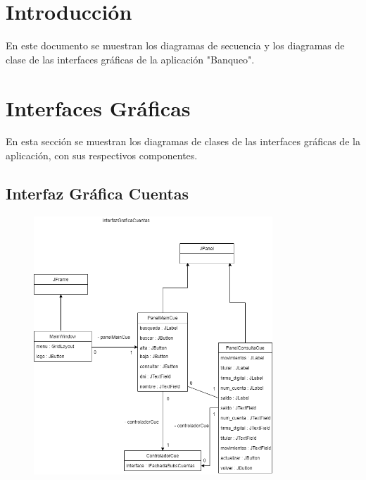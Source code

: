 \documentclass[12pt]{article}
\begin{document}
\section*{Introducción} %
En este documento se muestran los diagramas de secuencia y los diagramas de clase de las interfaces gráficas de la aplicación "Banqueo".

\section{Interfaces Gráficas} %
En esta sección se muestran los diagramas de clases de las interfaces gráficas de la aplicación, con sus respectivos componentes.

\subsection{Interfaz Gráfica Cuentas}
\begin{figure}[H]
    \centering
    \includegraphics[width=0.8\textwidth]{images/InterfazGraficaCuentas1.png}
\end{figure}
\end{document}
